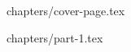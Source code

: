 \documentclass[a4paper,12pt]{article}
\begin{document}


{chapters/cover-page.tex}

\tableofcontents
\clearpage

{chapters/part-1.tex}
\end{document}
